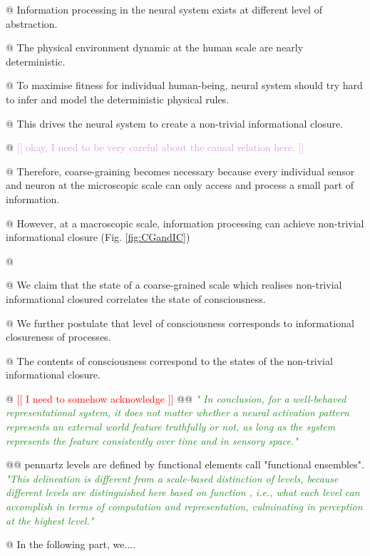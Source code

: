 \documentclass[utf8]{article}
\newenvironment{ants}
			{
			 \begin{easylist}[itemize]		
		 	}
			{
			\end{easylist}
			}
\newcommand{\rewrite}[1]{\textcolor{ForestGreen}{\textit{"#1"}}\newline}
\newcommand{\needref}[1]{%
			\ifthenelse{\equal{#1}{}}{%
				\todo[color=White, linecolor=BlueViolet]{\textcolor{BlueViolet}{Ref}}}{%
				\todo[color=White, linecolor=BlueViolet]{\textcolor{BlueViolet}{Ref: #1}}%
				}%
		}
\newcommand{\idea}[2][Plum]{\noindent
				\textcolor{#1}{[[ #2 ]]}}
\begin{document}
		\begin{ants}
			
				@ Information processing in the neural system exists at different level of abstraction.
				
				@ The physical environment dynamic at the human scale are nearly deterministic.\needref{Do we need ref here?} 
				
				@ To maximise fitness for individual human-being, neural system should try hard to infer and model the deterministic physical rules. 
				
				@ This drives the neural system to create a non-trivial informational closure.
				
				@ \idea{okay, I need to be very careful about the causal relation here.}
				
				@ Therefore, coarse-graining becomes necessary because every individual sensor and neuron at the microscopic scale can only access and process a small part of information.
				
				@ However, at a macroscopic scale, information processing can achieve non-trivial informational closure (Fig. \ref{fig:CGandIC})
			
			
				@ 
				
				@ We claim that the state of a coarse-grained scale which realises non-trivial informational closured correlates the state of consciousness. 
				
				@ We further postulate that level of consciousness corresponds to informational closureness of processes. 
				
				@ The contents of consciousness correspond to the states of the non-trivial informational closure. 
				
				@ \idea[red]{I need to somehow acknowledge \cite{pennartz2017consciousness}}
					@@ \rewrite{ In conclusion, for a well-behaved representational system, it does not matter whether a neural activation pattern represents an external world feature truthfully or not, as long as the system represents the feature consistently over time and in sensory space.}
					
					@@ pennartz levels are defined by functional elements call "functional ensembles". \cite{pennartz2017consciousness} \rewrite{This delineation is different from a scale-based distinction of levels, because different levels are distinguished here based on function , i.e., what each level can accomplish in terms of computation and representation, culminating in perception at the highest level.}
					
					
				
				
				@ In the following part, we....
											
				
		\end{ants}
		
\end{document}
